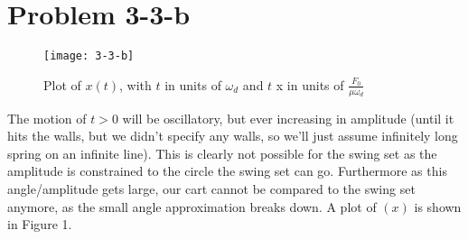 \section*{Problem 3-3-b}
\begin{wrapfigure}{r}{0.5\textwidth}
\texttt{[image: 3-3-b]}
\label{fig:3-3-a}
\caption{Plot of $x(t)$, with $t$ in units of $\omega_d$ and $t$ x in units of $\frac{F_0}{\mu\omega_d}$}
\vspace{40pt}
\end{wrapfigure}
The motion of $t>0$ will be oscillatory, but ever increasing in amplitude (until it hits the walls, but we didn't specify any walls, so we'll just assume infinitely long spring on an infinite line). This is clearly not possible for the swing set as the amplitude is constrained to the circle the swing set can go. Furthermore as this angle/amplitude gets large, our cart cannot be compared to the swing set anymore, as the small angle approximation breaks down. A plot of $(x)$ is shown in Figure 1.
